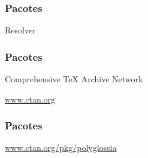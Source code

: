 \begin{frame}
  \frametitle{Pacotes}
  \huge
  Resolver 
\end{frame}

\begin{frame}
  \frametitle{Pacotes}
  \Huge
  Comprehensive \TeX{} Archive Network

  \url{www.ctan.org}
\end{frame}

\begin{frame}
  \frametitle{Pacotes}
  \huge
  \url{www.ctan.org/pkg/polyglossia}
\end{frame}
